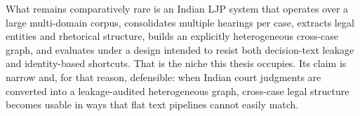 What remains comparatively rare is an Indian LJP system that operates over a large multi-domain corpus, consolidates multiple hearings per case, extracts legal entities and rhetorical structure, builds an explicitly heterogeneous cross-case graph, and evaluates under a design intended to resist both decision-text leakage and identity-based shortcuts. That is the niche this thesis occupies. Its claim is narrow and, for that reason, defensible: when Indian court judgments are converted into a leakage-audited heterogeneous graph, cross-case legal structure becomes usable in ways that flat text pipelines cannot easily match.